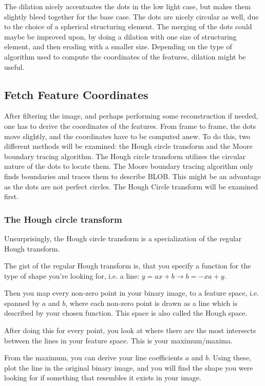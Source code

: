 The dilation nicely accentuates the dots in the low light case, but makes them slightly bleed together for the base case. The dots are nicely circular as well, due to the choice of a spherical structuring element. The merging of the dots could maybe be improved upon, by doing a dilation with one size of structuring element, and then eroding with a smaller size. 
Depending on the type of algorithm used to compute the coordinates of the features, dilation might be useful. 


\subsection{Fetch Feature Coordinates}
After filtering the image, and perhaps performing some reconstruction if needed, one has to derive the coordinates of the features. From frame to frame, the dots move slightly, and the coordinates have to be computed anew. To do this, two different methods will be examined: the Hough circle transform and the Moore boundary tracing algorithm. The Hough circle transform utilizes the circular nature of the dots to locate them. The Moore boundary tracing algorithm only finds boundaries and traces them to describe BLOB. This might be an advantage as the dots are not perfect circles. The Hough Circle transform will be examined first. 

\subsubsection{The Hough circle transform}
Unsurprisingly, the Hough circle transform is a specialization of the regular Hough transform.

The gist of the regular Hough transform is, that you
specify a function for the type of shape you're looking for, i.e. a line: $y = ax+b \rightarrow b=-xa+y$. 

Then you map every non-zero point in your binary image, to a feature space, i.e. spanned by $a$ and $b$, where each non-zero point is drawn as a line which is described by your chosen function. This space is also called the Hough space. 

After doing this for every point, you look at where there are the most intersects between the lines in your feature space. This is your maximum/maxima. 

From the maximum, you can derive your line coefficients $a$ and $b$. Using these, plot the line in the original binary image, and you will find the shape you were looking for if something that resembles it exists in your image. 

